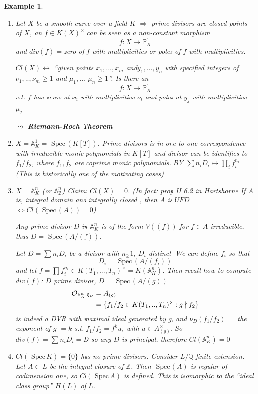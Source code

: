 \documentclass[11pt]{article}
\newtheorem{ex}[thm]{Example}
\newcommand{\spec}{\text{ Spec}\,}
\newcommand{\affn}{\mathbb A}
\newcommand{\proj}{\mathbb P}
\newcommand{\intg}{\mathbb Z}
\newcommand{\ratl}{\mathbb Q}
\newcommand{\calo}{{\cal O}}
\newcommand{\Lrta}{\Longrightarrow}
\newcommand{\lrta}{\longrightarrow}
\newcommand{\llrta}{\longleftrightarrow}
\newcommand{\Llrta}{\Longleftrightarrow}
\begin{document}
\begin{ex}
\begin{enumerate}[label=(\arabic*)]
\item
Let $X$ be  a smooth curve over a field $K$
$\Lrta$ prime divisors are closed points of $X$, an $f\in K(X)^\times$ can be seen as a non-constant morphism 
$$
f:X\lrta \proj^1_K
$$
and $div(f)=$zero of $f$ with multiplicities or poles of $f$ with multiplicities.

$Cl(X)\llrta$ ``given points $x_1,...,x_m$ and$y_1,...,y_n$  with specified integers of $\nu_1,..,\nu_m\geq 1$ and $\mu_1,...,\mu_n\geq 1$''. Is there an 
$$
f: X\lrta \proj^1_K
$$
s.t. $f$ has zeros at $x_i$ with multiplicities $\nu_i$ and poles at $y_j$ with multiplicities $\mu_j$

$\leadsto$ \textbf{Riemann-Roch Theorem}
\item $X=\affn^1_K=\spec(K[T])$. Prime divisors is in one to one correspondence with irreducible monic polynomials in $K[T]$ and divisor can be identifies to $f_1/f_2$, where $f_1,f_2$ are coprime monic polynomials. BY $\sum n_i D_i\mapsto \prod_i f_i^{n_i}$ 
(This is historically one of the motivating cases)
\item $X=\affn^n_K$ (or $\affn^n_\intg$)
\underline{Claim}: $Cl(X)=0$.
(In fact: prop II 6.2 in Hartshorne If $A$ is, integral domain and integrally closed , then $A$ is $UFD$ $\Llrta Cl(\spec(A))=0$)

Any prime divisor $D$ in $\affn^n_K$ is of the form $V((f))$ for $f\in A$ irreducible, thus $D=\spec(A/(f))$.

 Let $D=\sum n_i D_i$ be a divisor with $n_\geq 1$, $D_i$ distinct. We can define $f_i$ so that
 $$
D_i=\spec(A/(f_i))
 $$
 and let $f=\prod f_i^{n_i}\in K(T_1,...,T_n)^\times=K(\affn^n_K)$.
 Then recall how to compute $div(f)$: $D$ prime divisor, $D=\spec(A/(g))$
 $$
 \begin{aligned}
 \calo_{\affn^n_K,\tilde{\eta}_D}
 &=A_{(g)}\\
 &=\{f_1/f_2\in K(T_1,..,T_n)^\times: g\nmid f_2\}
 \end{aligned}
 $$
 is indeed a DVR with maximal ideal generated by $g$, and $\nu_D(f_1/f_2)=$ the exponent of $g$ $=k$ s.t. 
 $f_1/f_2=f^k u$, with $u\in A_{(g)}^\times$. So $div(f)=\sum n_i D_i=D$ so any $D$ is principal, therefore $Cl(\affn^n_K)=0$

\item $Cl(\spec K)=\{0\}$ has no prime divisors. Consider $L/\ratl$ finite extension. Let $A\subset L$ be the integral closure of $\intg$. Then $\spec(A)$ is regular of codimension one, so 
$
Cl(\spec A)
$
is defined.
This is isomorphic to the ``ideal class group'' $H(L)$ of $L$.


\end{enumerate}
\end{ex}
\end{document}
